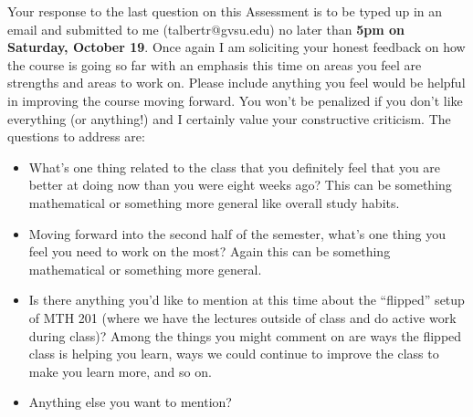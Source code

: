 \documentclass[addpoints]{exam}
\begin{document}
\begin{questions}
\question[6] Your response to the last question on this Assessment is to be typed up in an email and submitted to me (talbertr@gvsu.edu) no later than \textbf{5pm on Saturday, October 19}. Once again I am  soliciting your honest feedback on how the course is going so far with an emphasis this time on areas you feel are strengths and areas to work on. Please include anything you feel would be helpful in improving the course moving forward. You won't be penalized if you don't like everything (or anything!) and I certainly value your constructive criticism. The questions to address are: 
\begin{itemize}
	\item What's one thing related to the class that you definitely feel that you are better at doing now than you were eight weeks ago? This can be something mathematical or something more general like overall study habits. 
	\item Moving forward into the second half of the semester, what's one thing you feel you need to work on the most? Again this can be something mathematical or something more general. 
	\item Is there anything you'd like to mention at this time about the ``flipped'' setup of MTH 201 (where we have the lectures outside of class and do active work during class)? Among the things you might comment on are ways the flipped class is helping you learn, ways we could continue to improve the class to make you learn more, and so on. 
	\item Anything else you want to mention? 
\end{itemize}

\end{questions}
\end{document}
